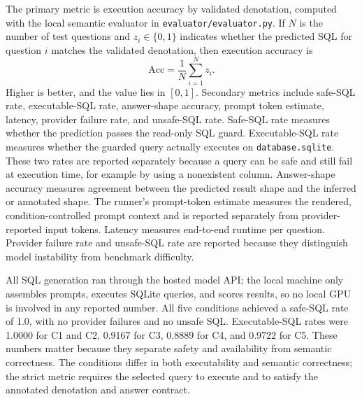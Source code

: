 \documentclass[cmc,article,submit,moreauthors,pdftex]{Definitions/tsp}
\begin{document}
The primary metric is execution accuracy by validated denotation, computed with the local semantic evaluator in \texttt{evaluator/evaluator.py}. If $N$ is the number of test questions and $z_i \in \{0,1\}$ indicates whether the predicted SQL for question $i$ matches the validated denotation, then execution accuracy is
\begin{equation}
\mathrm{Acc} = \frac{1}{N}\sum_{i=1}^{N} z_i.
\end{equation}
Higher is better, and the value lies in $[0,1]$. Secondary metrics include safe-SQL rate, executable-SQL rate, answer-shape accuracy, prompt token estimate, latency, provider failure rate, and unsafe-SQL rate. Safe-SQL rate measures whether the prediction passes the read-only SQL guard. Executable-SQL rate measures whether the guarded query actually executes on \texttt{database.sqlite}. These two rates are reported separately because a query can be safe and still fail at execution time, for example by using a nonexistent column. Answer-shape accuracy measures agreement between the predicted result shape and the inferred or annotated shape. The runner's prompt-token estimate measures the rendered, condition-controlled prompt context and is reported separately from provider-reported input tokens. Latency measures end-to-end runtime per question. Provider failure rate and unsafe-SQL rate are reported because they distinguish model instability from benchmark difficulty.

All SQL generation ran through the hosted model API; the local machine only assembles prompts, executes SQLite queries, and scores results, so no local GPU is involved in any reported number. All five conditions achieved a safe-SQL rate of 1.0, with no provider failures and no unsafe SQL. Executable-SQL rates were 1.0000 for C1 and C2, 0.9167 for C3, 0.8889 for C4, and 0.9722 for C5. These numbers matter because they separate safety and availability from semantic correctness. The conditions differ in both executability and semantic correctness; the strict metric requires the selected query to execute and to satisfy the annotated denotation and answer contract.
\end{document}
